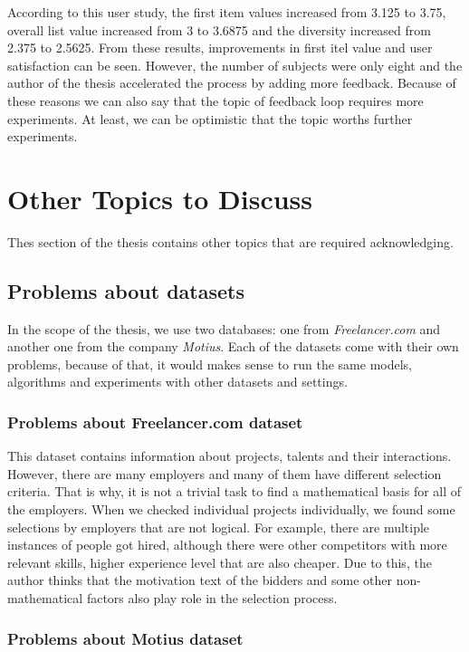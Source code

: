 According to this user study, the first item values increased from 3.125 to 3.75, overall list value increased from 3 to 3.6875 and the diversity increased from 2.375 to 2.5625. From these results, improvements in first itel value and user satisfaction can be seen. However, the number of subjects were only eight and the author of the thesis accelerated the process by adding more feedback. Because of these reasons we can also say that the topic of feedback loop requires more experiments. At least, we can be optimistic that the topic worths further experiments.

\section{Other Topics to Discuss}

Thes section of the thesis contains other topics that are required acknowledging.

\subsection{Problems about datasets}

In the scope of the thesis, we use two databases: one from \textit{Freelancer.com} and another one from the company \textit{Motius}. Each of the datasets come with their own problems, because of that, it would makes sense to run the same models, algorithms and experiments with other datasets and settings.

\subsubsection{Problems about Freelancer.com dataset}

This dataset contains information about projects, talents and their interactions. However, there are many employers and many of them have different selection criteria. That is why, it is not a trivial task to find a mathematical basis for all of the employers. When we checked individual projects individually, we found some selections by employers that are not logical. For example, there are multiple instances of people got hired, although there were other competitors with more relevant skills, higher experience level that are also cheaper. Due to this, the author thinks that the motivation text of the bidders and some other non-mathematical factors also play role in the selection process. 

\subsubsection{Problems about Motius dataset}


